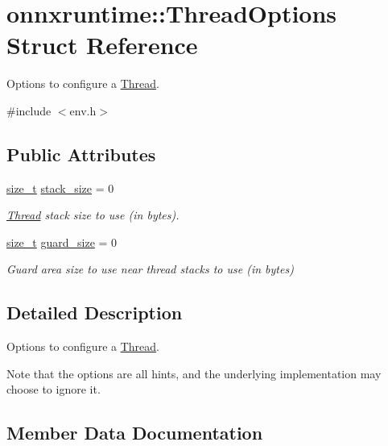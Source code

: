\hypertarget{structonnxruntime_1_1ThreadOptions}{}\section{onnxruntime\+:\+:Thread\+Options Struct Reference}
\label{structonnxruntime_1_1ThreadOptions}


Options to configure a \mbox{\hyperlink{classonnxruntime_1_1Thread}{Thread}}.  




{\ttfamily \#include $<$env.\+h$>$}

\subsection*{Public Attributes}
\begin{DoxyCompactItemize}
\item 
\mbox{\hyperlink{mlasi_8h_a503efbc1c6e50825320ad909366b78ab}{size\+\_\+t}} \mbox{\hyperlink{structonnxruntime_1_1ThreadOptions_ac8c2f806d6b39622c5535e83814c7dc0}{stack\+\_\+size}} = 0
\begin{DoxyCompactList}\small\item\em \mbox{\hyperlink{classonnxruntime_1_1Thread}{Thread}} stack size to use (in bytes). \end{DoxyCompactList}\item 
\mbox{\hyperlink{mlasi_8h_a503efbc1c6e50825320ad909366b78ab}{size\+\_\+t}} \mbox{\hyperlink{structonnxruntime_1_1ThreadOptions_a6fc7e395e3daa58154f0d3479cb409fc}{guard\+\_\+size}} = 0
\begin{DoxyCompactList}\small\item\em Guard area size to use near thread stacks to use (in bytes) \end{DoxyCompactList}\end{DoxyCompactItemize}


\subsection{Detailed Description}
Options to configure a \mbox{\hyperlink{classonnxruntime_1_1Thread}{Thread}}. 

Note that the options are all hints, and the underlying implementation may choose to ignore it. 

\subsection{Member Data Documentation}
\mbox{\label{structonnxruntime_1_1ThreadOptions_a6fc7e395e3daa58154f0d3479cb409fc}} 
